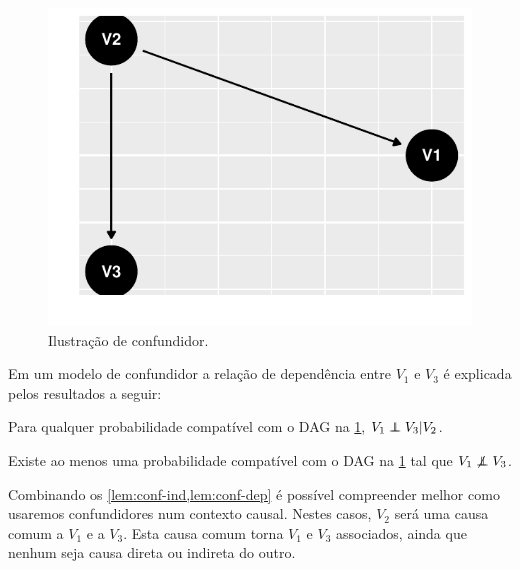 \begin{knitrout}
\color{fgcolor}\begin{figure}[t]

{\centering \includegraphics[width=\maxwidth]{./figures/confundidor-1} 

}

\caption[Ilustração de confundidor]{Ilustração de confundidor.}\label{fig:confundidor}
\end{figure}

\end{knitrout}

Em um modelo de confundidor 
a relação de dependência entre 
$V_1$ e $V_3$ é explicada pelos
resultados a seguir:

\begin{lemma}
 \label{lem:conf-ind}
 Para qualquer probabilidade compatível com 
 o DAG na \cref{fig:confundidor},
 $V_1 \perp\!\!\!\!\perp V_3 | V_2$.
\end{lemma}

\begin{lemma}
 \label{lem:conf-dep}
 Existe ao menos uma probabilidade compatível com
 o DAG na \cref{fig:confundidor} tal que
 $V_1 \not\perp\!\!\!\!\perp V_3$.
\end{lemma}

Combinando os \cref{lem:conf-ind,lem:conf-dep} é 
possível compreender melhor como 
usaremos confundidores num contexto causal.
Nestes casos, $V_2$ será uma causa comum a $V_1$ e a $V_3$.
Esta causa comum torna $V_1$ e $V_3$ associados,
ainda que nenhum seja causa direta ou indireta do outro.

